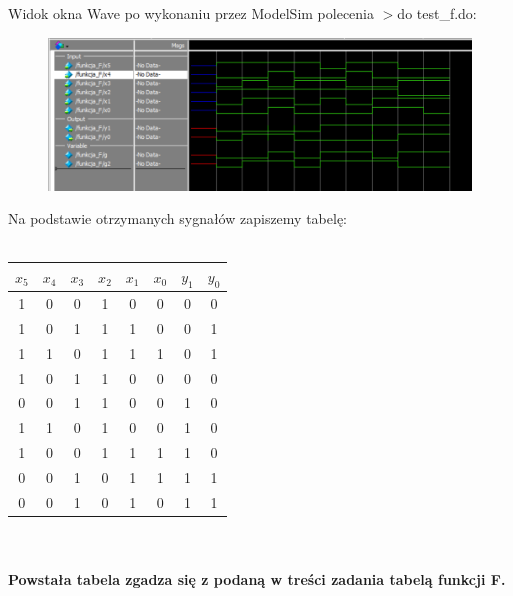 \documentclass[]{article}
\begin{document}
\newpage
\par Widok okna Wave po wykonaniu przez ModelSim polecenia $>$do test\_f.do:
\begin{figure}[H]
	\includegraphics[width=1.25\textwidth]{wave3.png}
\end{figure}
Na podstawie otrzymanych sygnałów zapiszemy tabelę:
\\
\\
\begin{tabular}[]{|c c c c c c |c c|}
\hline
$x_5$ & $x_4$ & $x_3$ & $x_2$ & $x_1$ & $x_0$ & $y_1$ & $y_0$ \\\hline
1 & 0 & 0 & 1 & 0 & 0 & 0 & 0\\
1 & 0 & 1 & 1 & 1 & 0 & 0 & 1\\
1 & 1 & 0 & 1 & 1 & 1 & 0 & 1\\
1 & 0 & 1 & 1 & 0 & 0 & 0 & 0\\
0 & 0 & 1 & 1 & 0 & 0 & 1 & 0\\
1 & 1 & 0 & 1 & 0 & 0 & 1 & 0\\
1 & 0 & 0 & 1 & 1 & 1 & 1 & 0\\
0 & 0 & 1 & 0 & 1 & 1 & 1 & 1\\
0 & 0 & 1 & 0 & 1 & 0 & 1 & 1\\ \hline
\end{tabular}
\\
\\ \textbf{Powstała tabela zgadza się z podaną w treści zadania tabelą funkcji F.}
\end{document}
